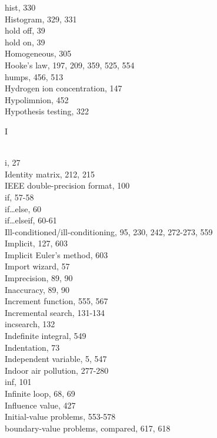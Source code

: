 \documentclass[../main.tex]{subfiles}
\begin{document}
\begin{multicols}{3}
    hist, 330\\
    Histogram, 329, 331\\
    hold off, 39\\
    hold on, 39\\
    Homogeneous, 305\\
    Hooke's law, 197, 209, 359, 525, 554\\
    humps, 456, 513\\
    Hydrogen ion concentration, 147\\
    Hypolimnion, 452\\
    Hypothesis testing, 322\vspace*{2mm}\\
    \begin{huge} I \end{huge}\\
    i, 27\\
    Identity matrix, 212, 215\\
    IEEE double-precision format, 100\\
    if, 57-58\\
    if\ldots else, 60\\
    if\ldots elseif, 60-61\\
    Ill-conditioned/ill-conditioning, 95, 230, 242, 272-273, 559\\
    Implicit, 127, 603\\
    Implicit Euler's method, 603\\
    Import wizard, 57\\
    Imprecision, 89, 90\\
    Inaccuracy, 89, 90\\
    Increment function, 555, 567\\
    Incremental search, 131-134\\
    incsearch, 132\\
    Indefinite integral, 549\\
    Indentation, 73\\
    Independent variable, 5, 547\\
    Indoor air pollution, 277-280\\
    inf, 101\\
    Infinite loop, 68, 69\\
    Influence value, 427\\
    Initial-value problems, 553-578\\
    \hspace*{3mm}boundary-value problems, compared, 617, 618\\

\end{multicols}
\end{document}
